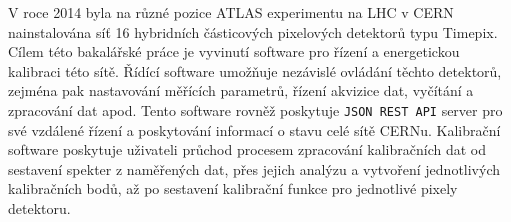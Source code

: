 \documentclass[11pt,twoside,a4paper]{book}
\begin{document}
	
	\baselineskip

	V roce 2014 byla na různé pozice ATLAS experimentu na LHC v CERN nainstalována síť 16 hybridních částicových pixelových detektorů typu Timepix. 
	Cílem této bakalářské práce je vyvinutí software pro řízení a energetickou kalibraci této sítě. Řídící software umožňuje nezávislé ovládání těchto detektorů, zejména pak nastavování měřících parametrů, řízení akvizice dat, vyčítání a zpracování dat apod. Tento software rovněž poskytuje \texttt{JSON REST API} server pro své vzdálené řízení a poskytování informací o stavu celé sítě CERNu.
	Kalibrační software poskytuje uživateli průchod procesem zpracování kalibračních dat od sestavení spekter z naměřených dat, přes jejich analýzu a vytvoření jednotlivých kalibračních bodů, až po sestavení kalibrační funkce pro jednotlivé pixely detektoru.


	\tableofcontents		%
	\listoffigures			%
	\listoftables			%
	\listofcodes			%

	\mainbodystarts









{
\def\CS{$\cal C\kern-0.1667em\lower.5ex\hbox{$\cal S$}\kern-0.075em $}

}


\appendix	

\printnomenclature
\label{apx:zkratky}
\end{document}
